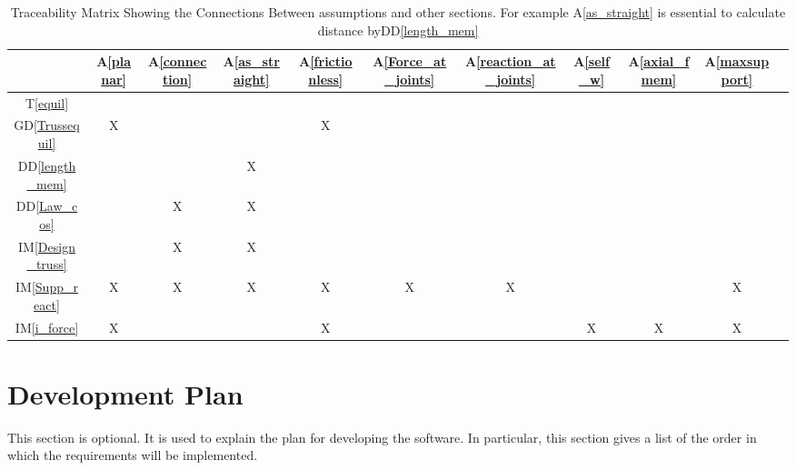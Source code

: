 \documentclass[12pt]{article}
\newcommand{\dref}[1]{GD\ref{#1}}
\newcommand{\ddref}[1]{DD\ref{#1}}
\newcommand{\tref}[1]{T\ref{#1}}
\newcommand{\aref}[1]{A\ref{#1}}
\newcommand{\iref}[1]{IM\ref{#1}}
\begin{document}
\begin{table}[h!]
\centering
\begin{tabular}{|c|c|c|c|c|c|c|c|c|c|c|}
\hline
	& \aref{planar}& \aref{connection}& \aref{as_straight}  &\aref{frictionless} & \aref{Force_at_joints} & \aref{reaction_at_joints} & \aref{self_w} 
 & \aref{axial_fmem} &\aref{maxsupport}\\
\hline
\tref{equil}       & & & & & & & & & \\ \hline
\dref{Trussequil}      &X & & &X & & & & & \\ \hline
\ddref{length_mem}      & & &X & & & & & & \\ \hline
\ddref{Law_cos}      & &X &X & & & & & & \\ \hline
\iref{Design_truss}      & &X &X & & & & & & \\ \hline
\iref{Supp_react}      &X &X &X &X &X &X & & &X \\ \hline
\iref{i_force}      &X & & &X & & &X &X &X \\ \hline
\end{tabular}
\caption{Traceability Matrix Showing the Connections Between assumptions and other sections. For example \aref{as_straight} is essential to calculate distance by\ddref{length_mem}}
\label{Table:A_trace}
\end{table}


\section{Development Plan}

This section is optional.  It is used to explain the plan for developing the software.  In particular, this section gives a list of the order in which the requirements will be implemented.
\end{document}
